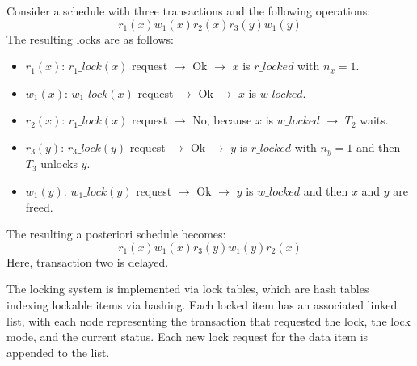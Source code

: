 \begin{example}
    Consider a schedule with three transactions and the following operations:
    \[r_1(x)w_1(x)r_2(x)r_3(y)w_1(y)\]
    The resulting locks are as follows:
    \begin{itemize}
        \item $r_1(x)$: $r_1\_lock(x)$ request $\rightarrow$ Ok $\rightarrow$ $x$ is $r\_locked$ with $n_x=1$. 
        \item $w_1(x)$: $w_1\_lock(x)$ request $\rightarrow$ Ok $\rightarrow$ $x$ is $w\_locked$. 
        \item $r_2(x)$: $r_1\_lock(x)$ request $\rightarrow$ No, because $x$ is $w\_locked$ $\rightarrow$ $T_2$ waits. 
        \item $r_3(y)$: $r_3\_lock(y)$ request $\rightarrow$ Ok $\rightarrow$ $y$ is $r\_locked$ with $n_y=1$ and then $T_3$ unlocks $y$. 
        \item $w_1(y)$: $w_1\_lock(y)$ request $\rightarrow$ Ok $\rightarrow$ $y$ is $w\_locked$ and then $x$ and $y$ are freed. 
    \end{itemize}
    The resulting a posteriori schedule becomes:
    \[r_1(x)w_1(x)r_3(y)w_1(y)r_2(x)\]
    Here, transaction two is delayed. 
\end{example}
The locking system is implemented via lock tables, which are hash tables indexing lockable items via hashing. 
Each locked item has an associated linked list, with each node representing the transaction that requested the lock, the lock mode, and the current status. 
Each new lock request for the data item is appended to the list.

